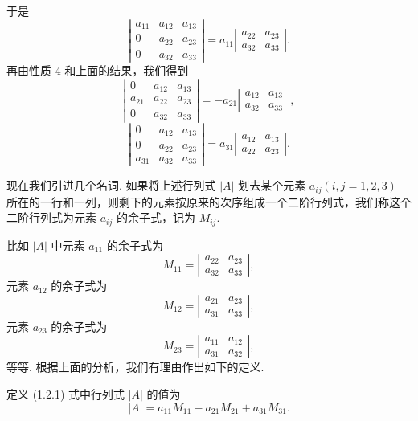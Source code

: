 \documentclass[UTF8,12pt,a4paper,fontset=fandol]{ctexart}
\begin{document}
于是
\[
\left|\begin{array}{ccc}
a_{11} & a_{12} & a_{13}\\
0 & a_{22} & a_{23}\\
0 & a_{32} & a_{33}
\end{array}\right|
=a_{11}
\left|\begin{array}{cc}
a_{22} & a_{23}\\
a_{32} & a_{33}
\end{array}\right|.
\]
再由性质 4 和上面的结果，我们得到
\[
\left|\begin{array}{ccc}
0 & a_{12} & a_{13}\\
a_{21} & a_{22} & a_{23}\\
0 & a_{32} & a_{33}
\end{array}\right|
=-a_{21}
\left|\begin{array}{cc}
a_{12} & a_{13}\\
a_{32} & a_{33}
\end{array}\right|,
\]
\[
\left|\begin{array}{ccc}
0 & a_{12} & a_{13}\\
0 & a_{22} & a_{23}\\
a_{31} & a_{32} & a_{33}
\end{array}\right|
=a_{31}
\left|\begin{array}{cc}
a_{12} & a_{13}\\
a_{22} & a_{23}
\end{array}\right|.
\]

现在我们引进几个名词. 如果将上述行列式 $|A|$ 划去某个元素 $a_{ij}(i,j=1,2,3)$ 所在的一行和一列，则剩下的元素按原来的次序组成一个二阶行列式，我们称这个二阶行列式为元素 $a_{ij}$ 的余子式，记为 $M_{ij}$.

比如 $|A|$ 中元素 $a_{11}$ 的余子式为
\[
M_{11}=
\left|\begin{array}{cc}
a_{22} & a_{23}\\
a_{32} & a_{33}
\end{array}\right|,
\]
元素 $a_{12}$ 的余子式为
\[
M_{12}=
\left|\begin{array}{cc}
a_{21} & a_{23}\\
a_{31} & a_{33}
\end{array}\right|,
\]
元素 $a_{23}$ 的余子式为
\[
M_{23}=
\left|\begin{array}{cc}
a_{11} & a_{12}\\
a_{31} & a_{32}
\end{array}\right|,
\]
等等.
根据上面的分析，我们有理由作出如下的定义.

定义 (1.2.1) 式中行列式 $|A|$ 的值为
\[
|A|=a_{11}M_{11}-a_{21}M_{21}+a_{31}M_{31}.
\]
\end{document}
